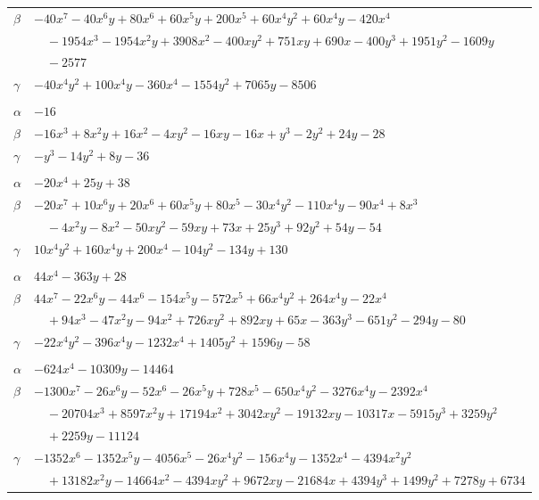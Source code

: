 \documentclass[11pt]{article}
\begin{document}
\begin{longtable}{@{}ll@{}}
$\beta$ & $-40x^{7}-40x^{6}y+80x^{6}+60x^{5}y+200x^{5}+60x^{4}y^{2}+60x^{4}y-420x^{4}$\\
 & $\quad -1954x^{3}-1954x^{2}y+3908x^{2}-400xy^{2}+751xy+690x-400y^{3}+1951y^{2}-1609y$\\
 & $\quad -2577$\\
$\gamma$ & $-40x^{4}y^{2}+100x^{4}y-360x^{4}-1554y^{2}+7065y-8506$\\
\addlinespace[3pt]
\multicolumn{2}{@{}l}{$\{i,j\}=\{16,17\}$, $k_{ij}=2^{5}\cdot 3$}\\
$\alpha$ & $-16$\\
$\beta$ & $-16x^{3}+8x^{2}y+16x^{2}-4xy^{2}-16xy-16x+y^{3}-2y^{2}+24y-28$\\
$\gamma$ & $-y^{3}-14y^{2}+8y-36$\\
\addlinespace[3pt]
\multicolumn{2}{@{}l}{$\{i,j\}=\{16,23\}$, $k_{ij}=2\cdot 3^{3}$}\\
$\alpha$ & $-20x^{4}+25y+38$\\
$\beta$ & $-20x^{7}+10x^{6}y+20x^{6}+60x^{5}y+80x^{5}-30x^{4}y^{2}-110x^{4}y-90x^{4}+8x^{3}$\\
 & $\quad -4x^{2}y-8x^{2}-50xy^{2}-59xy+73x+25y^{3}+92y^{2}+54y-54$\\
$\gamma$ & $10x^{4}y^{2}+160x^{4}y+200x^{4}-104y^{2}-134y+130$\\
\addlinespace[3pt]
\multicolumn{2}{@{}l}{$\{i,j\}=\{16,24\}$, $k_{ij}=2^{3}\cdot 3^{3}$}\\
$\alpha$ & $44x^{4}-363y+28$\\
$\beta$ & $44x^{7}-22x^{6}y-44x^{6}-154x^{5}y-572x^{5}+66x^{4}y^{2}+264x^{4}y-22x^{4}$\\
 & $\quad +94x^{3}-47x^{2}y-94x^{2}+726xy^{2}+892xy+65x-363y^{3}-651y^{2}-294y-80$\\
$\gamma$ & $-22x^{4}y^{2}-396x^{4}y-1232x^{4}+1405y^{2}+1596y-58$\\
\addlinespace[3pt]
\multicolumn{2}{@{}l}{$\{i,j\}=\{16,26\}$, $k_{ij}=2\cdot 3^{3}$}\\
$\alpha$ & $-624x^{4}-10309y-14464$\\
$\beta$ & $-1300x^{7}-26x^{6}y-52x^{6}-26x^{5}y+728x^{5}-650x^{4}y^{2}-3276x^{4}y-2392x^{4}$\\
 & $\quad -20704x^{3}+8597x^{2}y+17194x^{2}+3042xy^{2}-19132xy-10317x-5915y^{3}+3259y^{2}$\\
 & $\quad +2259y-11124$\\
$\gamma$ & $-1352x^{6}-1352x^{5}y-4056x^{5}-26x^{4}y^{2}-156x^{4}y-1352x^{4}-4394x^{2}y^{2}$\\
 & $\quad +13182x^{2}y-14664x^{2}-4394xy^{2}+9672xy-21684x+4394y^{3}+1499y^{2}+7278y+6734$\\

\end{longtable}
\end{document}
